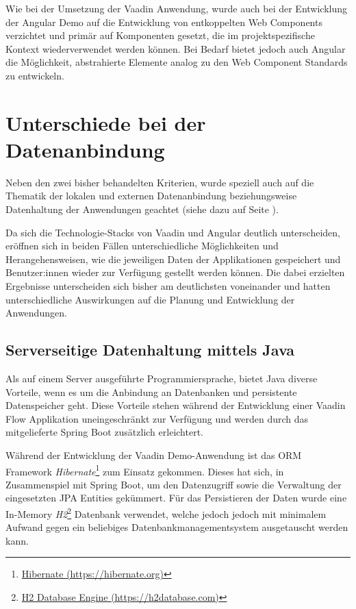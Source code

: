 \documentclass[a4paper,12pt,twoside]{scrreprt}
\begin{document}
Wie bei der Umsetzung der Vaadin Anwendung, wurde auch bei der Entwicklung der Angular Demo auf die Entwicklung von entkoppelten Web Components verzichtet und primär auf Komponenten gesetzt, die im projektspezifische Kontext wiederverwendet werden können. Bei Bedarf bietet jedoch auch Angular die Möglichkeit, abstrahierte Elemente analog zu den Web Component Standards zu entwickeln.

\section{Unterschiede bei der Datenanbindung}
\label{sec:results-datenanbindung}
Neben den zwei bisher behandelten Kriterien, wurde speziell auch auf die Thematik der lokalen und externen Datenanbindung beziehungsweise Datenhaltung der Anwendungen geachtet (siehe dazu \textit{} auf Seite \pageref{sub-sec:kriterien-datenanbindung}).

Da sich die Technologie-Stacks von Vaadin und Angular deutlich unterscheiden, eröffnen sich in beiden Fällen unterschiedliche Möglichkeiten und Herangehensweisen, wie die jeweiligen Daten der Applikationen gespeichert und Benutzer:innen wieder zur Verfügung gestellt werden können. Die dabei erzielten Ergebnisse unterscheiden sich bisher am deutlichsten voneinander und hatten unterschiedliche Auswirkungen auf die Planung und Entwicklung der Anwendungen.

\subsection{Serverseitige Datenhaltung mittels Java}
\label{sub-sec:result-datenanbindung-vaadin}
Als auf einem Server ausgeführte Programmiersprache, bietet Java diverse Vorteile, wenn es um die Anbindung an Datenbanken und persistente Datenspeicher geht. Diese Vorteile stehen während der Entwicklung einer Vaadin Flow Applikation uneingeschränkt zur Verfügung und werden durch das mitgelieferte Spring Boot zusätzlich erleichtert.

\medskip

Während der Entwicklung der Vaadin Demo-Anwendung ist das ORM Framework \textit{Hibernate}\footnote{\href{https://hibernate.org/}{Hibernate (https://hibernate.org)}} zum Einsatz gekommen. Dieses hat sich, in Zusammenspiel mit Spring Boot, um den Datenzugriff sowie die Verwaltung der eingesetzten \ac{JPA} Entities gekümmert. Für das Persistieren der Daten wurde eine In-Memory \textit{H2}\footnote{\href{https://h2database.com/}{H2 Database Engine (https://h2database.com)}} Datenbank verwendet, welche jedoch jedoch mit minimalem Aufwand gegen ein beliebiges Datenbankmanagementsystem ausgetauscht werden kann.
\end{document}
